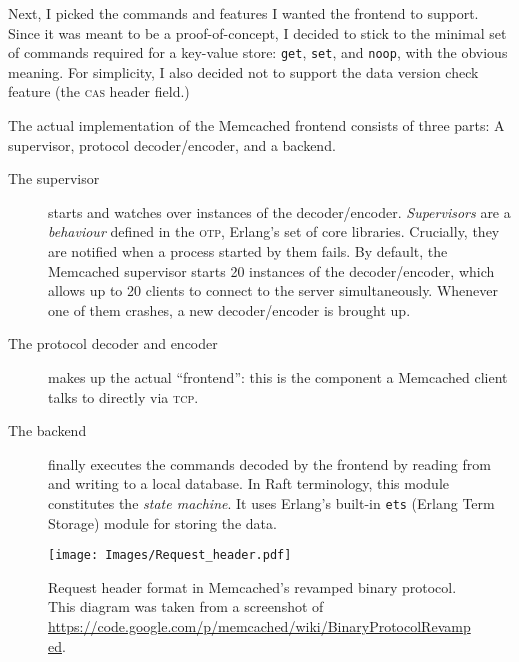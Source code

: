 \documentclass[draft,11pt,chapterprefix=true,toc=bibliography,numbers=noendperiod,
               footnotes=multiple,twoside]{scrreprt}
\begin{document}
Next, I picked the commands and features I wanted the frontend to support. Since it was meant to be a proof-of-concept, I decided to stick to the minimal set of commands required for a key-value store: \texttt{get}, \texttt{set}, and \texttt{noop}, with the obvious meaning. For simplicity, I also decided not to support the data version check feature (the \textsc{cas} header field.)


The actual implementation of the Memcached frontend consists of three parts: A supervisor, protocol decoder/encoder, and a backend.

\begin{description}
    \item[The supervisor] starts and watches over instances of the decoder/encoder. \emph{Supervisors} are a \emph{behaviour} defined in the \textsc{otp}, Erlang's set of core libraries. Crucially, they are notified when a process started by them fails. By default, the Memcached supervisor starts 20 instances of the decoder/encoder, which allows up to 20 clients to connect to the server simultaneously. Whenever one of them crashes, a new decoder/encoder is brought up.
    \item[The protocol decoder and encoder] makes up the actual \enquote{frontend}: this is the component a Memcached client talks to directly via \textsc{tcp}.
    \item[The backend] finally executes the commands decoded by the frontend by reading from and writing to a local database. In Raft terminology, this module constitutes the \emph{state machine}. It uses Erlang's built-in \texttt{ets} (Erlang Term Storage) module for storing the data.
\end{description}

\begin{figure}[p]
    \centering
    \texttt{[image: Images/Request\_header.pdf]}
    \caption[Request header format in Memcached's revamped binary protocol]{Request header format in Memcached's revamped binary protocol. This diagram was taken from a screenshot of \url{https://code.google.com/p/memcached/wiki/BinaryProtocolRevamped}.}
    \label{fig:request-header}
\end{figure}
\end{document}
